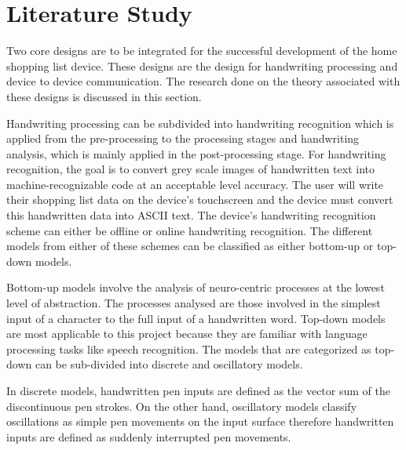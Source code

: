 
\section{Literature Study}

Two core designs are to be integrated for the successful development of the home shopping list device. These designs are the design for handwriting processing and device to device communication. The research done on the theory associated with these designs is discussed in this section.

Handwriting processing can be subdivided into handwriting recognition which is applied from the pre-processing to the processing stages and handwriting analysis, which is mainly applied in the post-processing stage. For handwriting recognition, the goal is to convert grey scale images of handwritten text into machine-recognizable code at an acceptable level accuracy. The user will write their shopping list data on the device’s touchscreen and the device must convert this handwritten data into ASCII text. The device’s handwriting recognition scheme can either be offline or online handwriting recognition. The different models from either of these schemes can be classified as either bottom-up or top-down models.

Bottom-up models involve the analysis of neuro-centric processes at the lowest level of abstraction. The processes analysed are those involved in the simplest input of a character to the full input of a handwritten word. Top-down models are most applicable to this project because they are familiar with language processing tasks like speech recognition. The models that are categorized as top-down can be sub-divided into discrete and oscillatory models. 

In discrete models, handwritten pen inputs are defined as the vector sum of the discontinuous pen strokes. On the other hand, oscillatory models classify oscillations as simple pen movements on the input surface therefore handwritten inputs are defined as suddenly interrupted pen movements.

